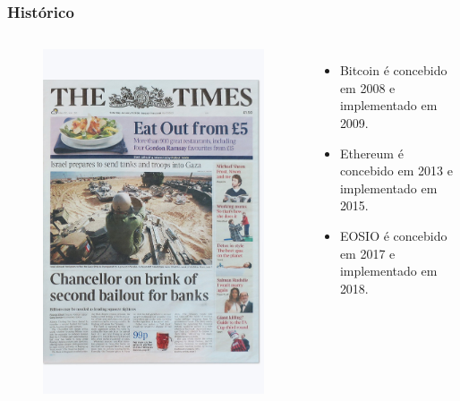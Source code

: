 \documentclass[11pt, red]{beamer}
\begin{document}
\begin{frame}
    \frametitle{Hist\'{o}rico}
        \begin{columns}
        \scriptsize
        \begin{figure}[htb]
            \begin{center}
                \includegraphics[width=1.2\linewidth]{fig/genesis.jpg}
            \end{center}
        \end{figure}
            \begin{itemize}
            	\item Bitcoin \'{e} concebido em 2008 e implementado em 2009.
                \item Ethereum \'{e} concebido em 2013 e implementado em 2015.
                \item EOSIO \'{e} concebido em 2017 e implementado em 2018.
            \end{itemize}
        \end{columns}
\end{frame}
\end{document}
